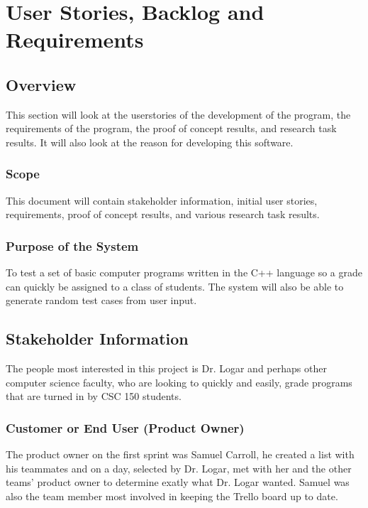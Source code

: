\chapter{User Stories, Backlog and Requirements}
\section{Overview}

This section will look at the userstories of the development of the program, the requirements
of the program, the proof of concept results, and research task results. It will also look at the
reason for developing this software. 

\subsection{Scope}

This document will contain stakeholder information, 
initial user stories, requirements, proof of concept results, and various research 
task results. 

\subsection{Purpose of the System}
To test a set of basic computer programs written in the C++ language so a grade can quickly be assigned to a class of students.
The system will also be able to generate random test cases from user input.

\section{ Stakeholder Information}

The people most interested in this project is Dr. Logar and perhaps other computer science faculty, who are looking to quickly
and easily, grade programs that are turned in by CSC 150 students.

\subsection{Customer or End User (Product Owner)}
The product owner on the first sprint was Samuel Carroll, he created a list with his teammates 
and on a day, selected by Dr. Logar, met with her and the other teams' product owner to determine
exatly what Dr. Logar wanted. Samuel was also the team member most involved in keeping the Trello 
board up to date.

